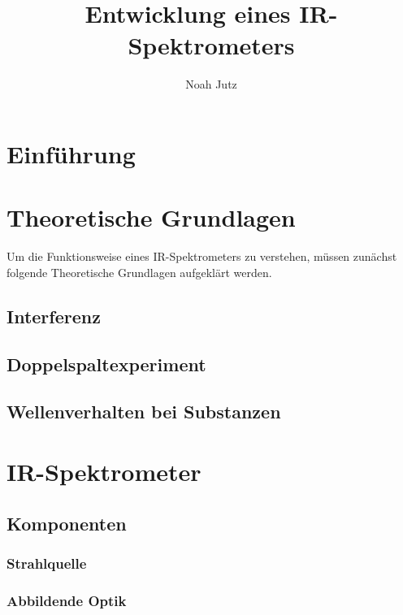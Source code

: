 \documentclass{article}
\title{Entwicklung eines IR-Spektrometers}
\author{Noah Jutz}
\date{}
\begin{document}
\maketitle
\thispagestyle{empty}

\newpage
\tableofcontents
\thispagestyle{empty}

\newpage
{}
\section{Einführung}


\newpage
\section{Theoretische Grundlagen}
Um die Funktionsweise eines IR-Spektrometers zu verstehen, müssen zunächst folgende Theoretische Grundlagen aufgeklärt werden.

\subsection{Interferenz}


\newpage
\subsection{Doppelspaltexperiment}


\newpage
\subsection{Wellenverhalten bei Substanzen}


\newpage
\section{IR-Spektrometer}

\subsection{Komponenten}

\subsubsection{Strahlquelle}


\subsubsection{Abbildende Optik}
\end{document}
